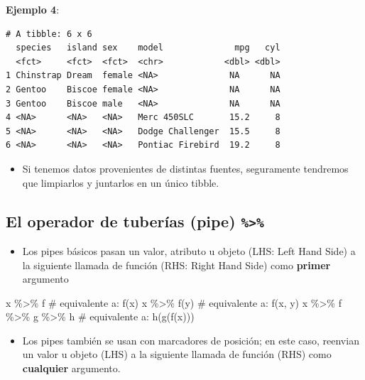 \documentclass[
  letterpaper,
  DIV=11,
  numbers=noendperiod]{scrreprt}
\newenvironment{Shaded}{\begin{snugshade}}{\end{snugshade}}
\newcommand{\CommentTok}[1]{\textcolor[rgb]{0.37,0.37,0.37}{#1}}
\newcommand{\FunctionTok}[1]{\textcolor[rgb]{0.28,0.35,0.67}{#1}}
\newcommand{\NormalTok}[1]{\textcolor[rgb]{0.00,0.23,0.31}{#1}}
\newcommand{\SpecialCharTok}[1]{\textcolor[rgb]{0.37,0.37,0.37}{#1}}
\providecommand{\tightlist}{%
  \setlength{\itemsep}{0pt}\setlength{\parskip}{0pt}}\usepackage{longtable,booktabs,array}
\begin{document}
\textbf{Ejemplo 4}:

\begin{verbatim}
# A tibble: 6 x 6
  species   island sex    model              mpg   cyl
  <fct>     <fct>  <fct>  <chr>            <dbl> <dbl>
1 Chinstrap Dream  female <NA>              NA      NA
2 Gentoo    Biscoe female <NA>              NA      NA
3 Gentoo    Biscoe male   <NA>              NA      NA
4 <NA>      <NA>   <NA>   Merc 450SLC       15.2     8
5 <NA>      <NA>   <NA>   Dodge Challenger  15.5     8
6 <NA>      <NA>   <NA>   Pontiac Firebird  19.2     8
\end{verbatim}

\begin{itemize}
\tightlist
\item
  Si tenemos datos provenientes de distintas fuentes, seguramente
  tendremos que limpiarlos y juntarlos en un único tibble.
\end{itemize}

\subsection{\texorpdfstring{El operador de tuberías (pipe)
\texttt{\%\textgreater{}\%}}{El operador de tuberías (pipe) \%\textgreater\%}}\label{el-operador-de-tuberuxedas-pipe}

\begin{itemize}
\tightlist
\item
  Los pipes básicos pasan un valor, atributo u objeto (LHS: Left Hand
  Side) a la siguiente llamada de función (RHS: Right Hand Side) como
  \textbf{primer} argumento
\end{itemize}

\begin{Shaded}
\begin{Highlighting}[]
\NormalTok{x }\SpecialCharTok{\%\textgreater{}\%}\NormalTok{ f }\CommentTok{\# equivalente a: f(x)}
\NormalTok{x }\SpecialCharTok{\%\textgreater{}\%} \FunctionTok{f}\NormalTok{(y) }\CommentTok{\# equivalente a: f(x, y)}
\NormalTok{x }\SpecialCharTok{\%\textgreater{}\%}\NormalTok{ f }\SpecialCharTok{\%\textgreater{}\%}\NormalTok{ g }\SpecialCharTok{\%\textgreater{}\%}\NormalTok{ h }\CommentTok{\# equivalente a: h(g(f(x)))}
\end{Highlighting}
\end{Shaded}

\begin{itemize}
\tightlist
\item
  Los pipes también se usan con marcadores de posición; en este caso,
  reenvian un valor u objeto (LHS) a la siguiente llamada de función
  (RHS) como \textbf{cualquier} argumento.
\end{itemize}
\end{document}
